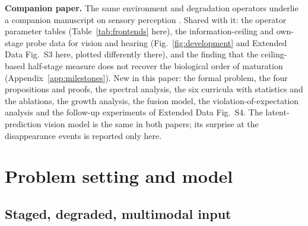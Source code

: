 \documentclass{article}
\theoremstyle{plain}
\theoremstyle{remark}
\begin{document}
\textbf{Companion paper.} The same environment and degradation operators underlie a companion manuscript on sensory perception \autocite{mohapatra2026senses}. Shared with it: the operator parameter tables (Table~\ref{tab:frontends} here), the information-ceiling and own-stage probe data for vision and hearing (Fig.~\ref{fig:development} and Extended Data Fig.~S3 here, plotted differently there), and the finding that the ceiling-based half-stage measure does not recover the biological order of maturation (Appendix~\ref{app:milestones}). New in this paper: the formal problem, the four propositions and proofs, the spectral analysis, the six curricula with statistics and the ablations, the growth analysis, the fusion model, the violation-of-expectation analysis and the follow-up experiments of Extended Data Fig.~S4. The latent-prediction vision model is the same in both papers; its surprise at the disappearance events is reported only here.

\section{Problem setting and model}
\label{sec:model}

\subsection{Staged, degraded, multimodal input}
\end{document}
